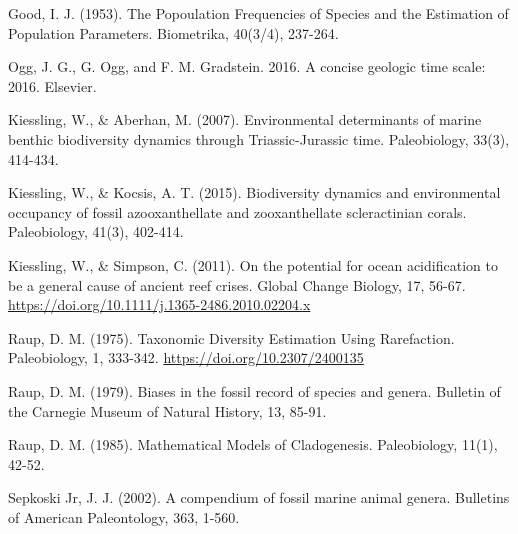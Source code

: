 \documentclass[]{article}
\begin{document}
Good, I. J. (1953). The Popoulation Frequencies of Species and the
Estimation of Population Parameters. Biometrika, 40(3/4), 237-264.

Ogg, J. G., G. Ogg, and F. M. Gradstein. 2016. A concise geologic time
scale: 2016. Elsevier.

Kiessling, W., \& Aberhan, M. (2007). Environmental determinants of
marine benthic biodiversity dynamics through Triassic-Jurassic time.
Paleobiology, 33(3), 414-434.

Kiessling, W., \& Kocsis, A. T. (2015). Biodiversity dynamics and
environmental occupancy of fossil azooxanthellate and zooxanthellate
scleractinian corals. Paleobiology, 41(3), 402-414.

Kiessling, W., \& Simpson, C. (2011). On the potential for ocean
acidification to be a general cause of ancient reef crises. Global
Change Biology, 17, 56-67.
\url{https://doi.org/10.1111/j.1365-2486.2010.02204.x}

Raup, D. M. (1975). Taxonomic Diversity Estimation Using Rarefaction.
Paleobiology, 1, 333-342. \url{https://doi.org/10.2307/2400135}

Raup, D. M. (1979). Biases in the fossil record of species and genera.
Bulletin of the Carnegie Museum of Natural History, 13, 85-91.

Raup, D. M. (1985). Mathematical Models of Cladogenesis. Paleobiology,
11(1), 42-52.

Sepkoski Jr, J. J. (2002). A compendium of fossil marine animal genera.
Bulletins of American Paleontology, 363, 1-560.
\end{document}
